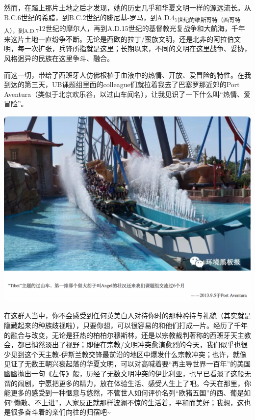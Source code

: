 \documentclass[
]{book}
\begin{document}
然而，在踏上那片土地之后才发现，她的历史几乎和华夏文明一样的源远流长。从B.C.6世纪的希腊，到B.C.2世纪的腓尼基-罗马，到A.D.4\textsubscript{7世纪的维斯哥特（西哥特人），到A.D.7}12世纪的摩尔人，再到A.D.15世纪的基督教光复战争和大航海，千年来这片土地一直纷争不断。无论是西欧的拉丁/蛮族文明，还是北非的阿拉伯文明，每一次扩张，兵锋所指就是这里；长期以来，不同的文明在这里战争、妥协，风格迥异的民族在这里争斗、融合。

而这一切，带给了西班牙人仿佛根植于血液中的热情、开放、爱冒险的特性。在我到达的第三天，UB课题组里面的colleague们就拉着我去了巴塞罗那近郊的Port Aventura（类似于北京欢乐谷，以过山车闻名），让我见识了一下什么叫``热情、爱冒险''。

\includegraphics[width=8.33in]{images/xt8}

在这群人当中，你不会感受到任何英美白人对待你时的那种矜持与礼貌（其实就是隐藏起来的种族歧视啦），只要你想，可以很容易的和他们打成一片。经历了千年的融合与改变，无论是狂热的柏柏尔穆斯林，还是以宗教裁判著称的西班牙天主教会，都已悄然淡出了视野；即便在宗教/文明冲突愈演愈烈的今天，我们似乎也很少见到这个天主教-伊斯兰教交锋最前沿的地区中爆发什么宗教冲突；也许，就像见证了无数王朝兴衰起落的华夏文明，可以对高喊着要``再主导世界一百年''的美国幽幽抛出一句《左传》般，历经了无数文明冲突的伊比利亚，也早已看淡了这般无谓的闹剧，宁愿把更多的精力，放在体验生活、感受人生上了吧。今天在那里，你能更多的感受到一种惬意与悠然，不管世人如何评价名列``欧猪五国''的西、葡是如何``懒散、不上进''，人家反正就那样波澜不惊的生活着，平和而美好；我想，这也是很多奋斗着的亲们向往的归宿吧\textasciitilde{}
\end{document}
